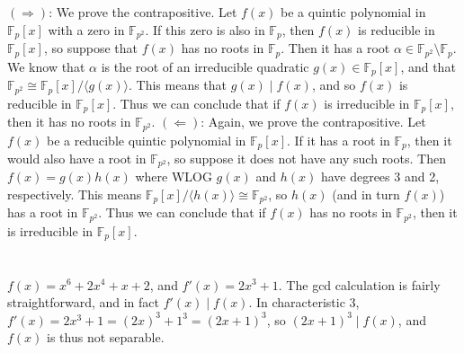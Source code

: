 \documentclass[11pt]{article}
\def\F{\mathbb{F}}
\def\a{\alpha}
\begin{document}
\renewcommand{\thesubsection}{\thesection.\alph{subsection}}
\section{} %
$(\Rightarrow)$: We prove the contrapositive.
Let $f(x)$ be a quintic polynomial in $\F_p[x]$ with a zero in $\F_{p^2}$.
If this zero is also in $\F_p$, then $f(x)$ is reducible in $\F_p[x]$, so suppose that $f(x)$ has no roots in $\F_p$.
Then it has a root $\a\in\F_{p^2}\setminus\F_p$.
We know that $\a$ is the root of an irreducible quadratic $g(x)\in\F_p[x]$, and that $\F_{p^2}\cong\F_p[x]/\langle g(x)\rangle$.
This means that $g(x)\mid f(x)$, and so $f(x)$ is reducible in $\F_p[x]$.
Thus we can conclude that if $f(x)$ is irreducible in $\F_p[x]$, then it has no roots in $\F_{p^2}$.
\newline
\newline
$(\Leftarrow)$: Again, we prove the contrapositive.
Let $f(x)$ be a reducible quintic polynomial in $\F_p[x]$.
If it has a root in $\F_p$, then it would also have a root in $\F_{p^2}$, so suppose it does not have any such roots.
Then $f(x)=g(x)h(x)$ where WLOG $g(x)$ and $h(x)$ have degrees 3 and 2, respectively.
This means $\F_p[x]/\langle h(x)\rangle\cong\F_{p^2}$, so $h(x)$ (and in turn $f(x)$) has a root in $\F_{p^2}$.
Thus we can conclude that if $f(x)$ has no roots in $\F_{p^2}$, then it is irreducible in $\F_p[x]$.


\section{} %
\subsection{} %
$f(x) = x^6+2x^4+x+2$, and $f'(x)=2x^3+1$.
The gcd calculation is fairly straightforward, and in fact $f'(x)\mid f(x)$.
In characteristic 3, $f'(x)=2x^3+1=(2x)^3+1^3=(2x+1)^3$, so $(2x+1)^3\mid f(x)$, and $f(x)$ is thus not separable.
\end{document}
